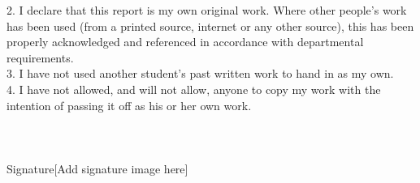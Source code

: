 2.	I declare that this report is my own original work. Where other people's work has been used (from a printed source, internet or any other source), this has been properly acknowledged and referenced in accordance with departmental requirements. \\
3.	I have not used another student's past written work to hand in as my own. \\
4.	I have not allowed, and will not allow, anyone to copy my work with the intention of passing it off as his or her own work. \\ \\ \\ \\
Signature[Add signature image here] \\ \\
\vspace*{\fill}
